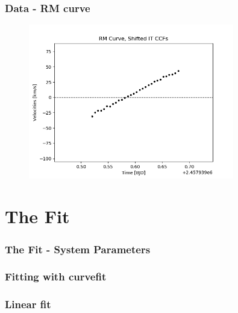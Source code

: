\documentclass[show notes]{beamer}
\begin{document}
\begin{frame}
\frametitle{Data - RM curve}
\begin{figure}
	\centering
	\includegraphics[width=0.8\textwidth]{../figures/RM_shift.png}
	\label{fig:RM_shift}
\end{figure}
\end{frame}

\section*{The Fit}

\begin{frame}
\frametitle{The Fit - System Parameters}

\end{frame}

\begin{frame}
\frametitle{Fitting with curvefit}

\end{frame}

\begin{frame}
\frametitle{Linear fit}
\end{frame}
\end{document}
